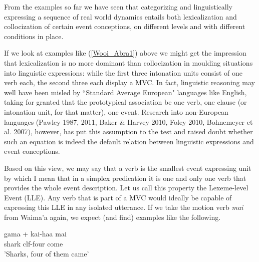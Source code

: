 From the examples so far we have seen that categorizing and linguistically expressing a sequence of real world dynamics entails both lexicalization and collocization of certain event conceptions, on different levels and with different conditions in place. 

If we look at examples like (\ref{Wooi_Abra1}) above we might get the impression that lexicalization is no more dominant than collocization in moulding situations into linguistic expressions: while the first three intonation units consist of one verb each, the second three each display a MVC. In fact, linguistic reasoning may well have been misled by ``Standard Average European" languages like English, taking for granted that the prototypical association be one verb, one clause (or intonation unit, for that matter), one event. Research into non-European languages (Pawley 1987, 2011, Baker \& Harvey 2010, Foley 2010, Bohnemeyer et al. 2007), however, has put this assumption to the test and raised doubt whether such an equation is indeed the default relation between linguistic expressions and event conceptions.

Based on this view, we may say that a verb is the smallest event expressing unit by which I mean that in a simplex predication it is one and only one verb that provides the whole event description. Let us call this property the Lexeme-level Event (LLE). Any verb that is part of a MVC would ideally be capable of expressing this LLE in any isolated utterance. If we take the motion verb \textit{mai} from Waima'a again, we expect (and find) examples like the following.

\pex \label{WMH_Julio_goat309}
\ea%
\gll gama + kai-haa mai \\
shark \acs{clf}-four come \\
\glft 'Sharks, four of them came'  \ 
\z
\xe


